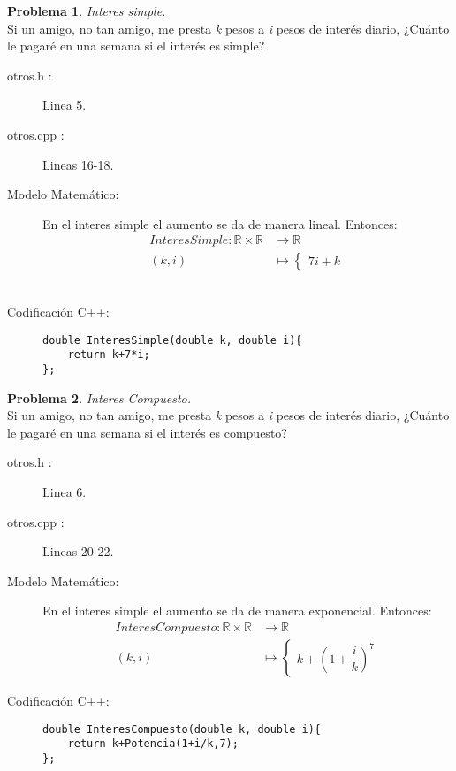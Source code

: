 \documentclass{article}
\theoremstyle{plain}
\theoremstyle{definition}
\newtheorem{problem}{Problema}
\begin{document}
\begin{problem} \emph{Interes simple.}\\
\hspace*{7mm}Si un amigo, no tan amigo, me presta \emph{k} pesos a \emph{i} pesos de interés diario, ¿Cuánto le pagaré en una semana si el interés es simple?
\begin{description}
\item[otros.h :] Linea 5. \item[otros.cpp :] Lineas 16-18.

\item[Modelo Matemático:]
En el interes simple el aumento se da de manera lineal.
Entonces:
\begin{align*}
InteresSimple: \mathbb{R}\times\mathbb{R} &\to \mathbb{R}\\
(k,i) &\mapsto \begin{cases}
7i+k
\end{cases}
\end{align*}
\\
\item[Codificación \textsf{C++}:]\hfill
%
\begin{verbatim}
double InteresSimple(double k, double i){
    return k+7*i;
};
\end{verbatim}
\end{description}
\end{problem}

\begin{problem} \emph{Interes Compuesto.}\\
\hspace*{7mm}Si un amigo, no tan amigo, me presta \emph{k} pesos a \emph{i} pesos de interés diario, ¿Cuánto le pagaré en una semana si el interés es compuesto?
\begin{description}
\item[otros.h :] Linea 6. \item[otros.cpp :] Lineas 20-22.

\item[Modelo Matemático:]
En el interes simple el aumento se da de manera exponencial.
Entonces:
\begin{align*}
InteresCompuesto: \mathbb{R}\times\mathbb{R} &\to \mathbb{R}\\
(k,i) &\mapsto \begin{cases}
k+\left(1+\dfrac{i}{k}\right)^7
\end{cases}
\end{align*}
%
\item[Codificación \textsf{C++}:]\hfill
%
\begin{verbatim}
double InteresCompuesto(double k, double i){
    return k+Potencia(1+i/k,7);
};
\end{verbatim}
\end{description}
\end{problem}
\end{document}
